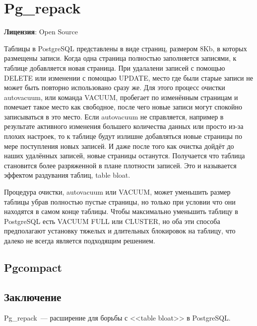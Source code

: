 \section{Pg\_repack}
\textbf{Лицензия}: Open Source

Таблицы в PostgreSQL представлены в виде страниц, размером 8Kb, в которых размещены записи. Когда одна страница полностью заполняется записями, к таблице добавляется новая страница. При удалалени записей с помощью DELETE или изменении с помощью UPDATE, место где были старые записи не может быть повторно использовано сразу же. Для этого процесс очистки autovacuum, или команда VACUUM, пробегает по изменённым страницам и помечает такое место как свободное, после чего новые записи могут спокойно записываться в это место. Если autovacuum не справляется, например в результате активного изменения большего количества данных или просто из-за плохих настроек, то к таблице будут излишне добавляться новые страницы по мере поступления новых записей. И даже после того как очистка дойдёт до наших удалённых записей, новые страницы останутся. Получается что таблица становится более разряженной в плане плотности записей. Это и называется эффектом раздувания таблиц, table bloat.

Процедура очистки, autovacuum или VACUUM, может уменьшить размер таблицы убрав полностью пустые страницы, но только при условии что они находятся в самом конце таблицы. Чтобы максимально уменьшить таблицу в PostgreSQL есть VACUUM FULL или CLUSTER, но оба эти способа предполагают установку тяжелых и длительных блокировок на таблицу, что далеко не всегда является подходящим решением.


\subsection{Pgcompact}


\subsection{Заключение}
Pg\_repack~--- расширение для борьбы с <<table bloat>> в PostgreSQL.